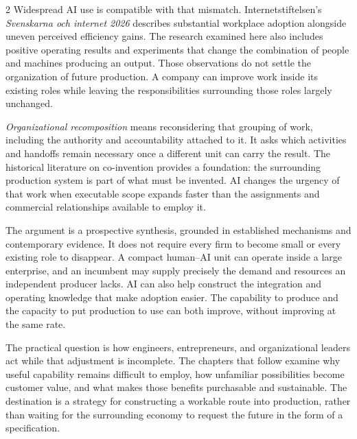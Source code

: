 \begin{multicols}{2}
Widespread AI use is compatible with that mismatch. Internetstiftelsen's
\emph{Svenskarna och internet 2026}
\citep{internetstiftelsen2026internet} describes substantial workplace
adoption alongside uneven perceived efficiency gains. The research
examined here also includes positive operating results and experiments
that change the combination of people and machines producing an output.
Those observations do not settle the organization of future production.
A company can improve work inside its existing roles while leaving the
responsibilities surrounding those roles largely unchanged.

\emph{Organizational recomposition} means reconsidering that grouping of
work, including the authority and accountability attached to it. It asks
which activities and handoffs remain necessary once a different unit can
carry the result. The historical literature on co-invention
\citep{bresnahan1996coinvention} provides a foundation: the surrounding
production system is part of what must be invented. AI changes the
urgency of that work when executable scope expands faster than the
assignments and commercial relationships available to employ it.

The argument is a prospective synthesis, grounded in established
mechanisms and contemporary evidence. It does not require every firm to
become small or every existing role to disappear. A compact human--AI
unit can operate inside a large enterprise, and an incumbent may supply
precisely the demand and resources an independent producer lacks. AI can
also help construct the integration and operating knowledge that make
adoption easier. The capability to produce and the capacity to put
production to use can both improve, without improving at the same rate.

The practical question is how engineers, entrepreneurs, and
organizational leaders act while that adjustment is incomplete. The
chapters that follow examine why useful capability remains difficult to
employ, how unfamiliar possibilities become customer value, and what
makes those benefits purchasable and sustainable. The destination is a
strategy for constructing a workable route into production, rather than
waiting for the surrounding economy to request the future in the form of
a specification.

\end{multicols}

